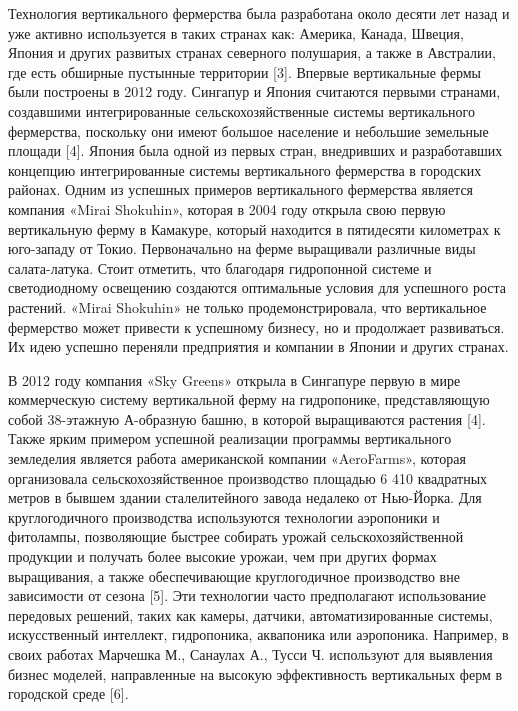 Технология вертикального фермерства была разработана около десяти лет
назад и уже активно используется в таких странах как: Америка, Канада,
Швеция, Япония и других развитых странах северного полушария, а также в
Австралии, где есть обширные пустынные территории {[}3{]}. Впервые
вертикальные фермы были построены в 2012 году. Сингапур и Япония
считаются первыми странами, создавшими интегрированные
сельскохозяйственные системы вертикального фермерства, поскольку они
имеют большое население и небольшие земельные площади {[}4{]}. Япония
была одной из первых стран, внедривших и разработавших концепцию
интегрированные системы вертикального фермерства в городских районах.
Одним из успешных примеров вертикального фермерства является компания
«Mirai Shokuhin», которая в 2004 году открыла свою первую вертикальную
ферму в Камакуре, который находится в пятидесяти километрах к юго-западу
от Токио. Первоначально на ферме выращивали различные виды
салата-латука. Стоит отметить, что благодаря гидропонной системе и
светодиодному освещению создаются оптимальные условия для успешного
роста растений. «Mirai Shokuhin» не только продемонстрировала, что
вертикальное фермерство может привести к успешному бизнесу, но и
продолжает развиваться. Их идею успешно переняли предприятия и компании
в Японии и других странах.

В 2012 году компания «Sky Greens» открыла в Сингапуре первую в мире
коммерческую систему вертикальной ферму на гидропонике, представляющую
собой 38-этажную А-образную башню, в которой выращиваются растения
{[}4{]}. Также ярким примером успешной реализации программы
вертикального земледелия является работа американской компании
«AeroFarms», которая организовала сельскохозяйственное производство
площадью 6 410 квадратных метров в бывшем здании сталелитейного завода
недалеко от Нью-Йорка. Для круглогодичного производства используются
технологии аэропоники и фитолампы, позволяющие быстрее собирать урожай
сельскохозяйственной продукции и получать более высокие урожаи, чем при
других формах выращивания, а также обеспечивающие круглогодичное
производство вне зависимости от сезона {[}5{]}. Эти технологии часто
предполагают использование передовых решений, таких как камеры, датчики,
автоматизированные системы, искусственный интеллект, гидропоника,
аквапоника или аэропоника. Например, в своих работах Марчешка М.,
Санаулах А., Тусси Ч. используют для выявления бизнес моделей,
направленные на высокую эффективность вертикальных ферм в городской
среде {[}6{]}.

